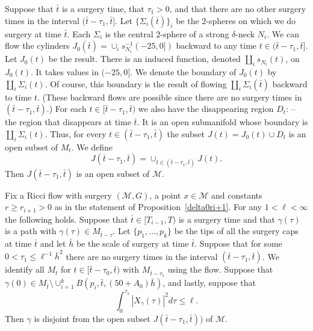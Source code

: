 \begin{definition}
\label{def:disappearing-region-J}
\label{J}
 Suppose that $\bar t$ is a surgery
time, that $\tau_1>0$,  and that there are no other surgery times in
the interval $(\bar t-\tau_1,\bar t]$. Let $\{\Sigma_i(\bar t)\}_i$
be the $2$-spheres on which we do surgery at time $\bar t$. Each
$\Sigma_i$ is the central $2$-sphere of a strong $\delta$-neck
$N_i$. We can flow the cylinders $J_0(\bar
t)=\cup_is_{N_i}^{-1}(-25,0])$ backward to any time
 $t\in (\bar t-\tau_1,\bar t]$. Let $J_0(t)$ be
the result. There is an induced function, denoted
$\coprod_is_{N_i}(t)$, on $J_0(t)$. It takes values in $ (-25,0]$.
We denote the boundary of $J_0(t)$ by $\coprod_i\Sigma_i(t)$. Of
course, this boundary is the result of flowing
$\coprod_i\Sigma_i(\bar t)$ backward to time $t$. (These backward
flows are possible since there are no surgery times in $(\bar
t-\tau_1,\bar t)$.) For each $t\in [\bar t-\tau_1,\bar t)$ we also
have the disappearing region $D_t$: -- the region that disappears at
time $\bar t$. It is an open submanifold whose boundary is
$\coprod_i\Sigma_i(t)$. Thus, for every $t\in (\bar t-\tau_1,\bar
t)$ the subset $J(t)=J_0(t)\cup D_t$ is an open subset of $M_t$. We
define
$$J(\bar t-\tau_1,\bar t)=\cup_{t\in (\bar t-\tau_1,\bar t)}J(t).$$
Then $J(\bar t-\tau_1,\bar t)$ is an open subset of ${\mathcal M}$.

\end{definition}










\begin{lemma}
\label{lem:short-energy-avoids-disappearing-region}
\label{15.17}
Fix a Ricci flow with surgery $({\mathcal M},G)$, a point $x\in
{\mathcal M}$ and constants $r\ge r_{i+1}>0$ as in the statement of
Proposition~\ref{delta0ri+1}. For any $1<\ell<\infty$ the following
holds. Suppose that $\bar t\in [T_{i-1},T)$ is a surgery time and
that  $\gamma(\tau)$ is a path with $\gamma(\tau)\in M_{\bar
t-\tau}$. Let $\{p_1,\ldots,p_k\}$ be the tips of all the surgery
caps at time $\bar t$ and let $\bar h$ be the scale of surgery at
time $\bar t$. Suppose that for some $0<\tau_1\le \ell^{-1} \bar
h^2$ there are no surgery times in the interval $(\bar t-\tau_1,\bar
t)$. We identify all $M_t$ for $t\in [\bar t-\tau_0,\bar t)$ with
$M_{\bar t-\tau_1}$ using the flow. Suppose that $\gamma(0)\in
M_{\bar t}\setminus \cup_{i=1}^kB(p_i,\bar t,(50+A_0)\bar h)$, and
lastly, suppose that
$$\int_{0}^{\tau_1}|X_\gamma(\tau)|^2d\tau\le \ell.$$
Then $\gamma$ is disjoint from the open subset $J(\bar t-\tau_1,\bar
t))$ of ${\mathcal M}$.
\end{lemma}




